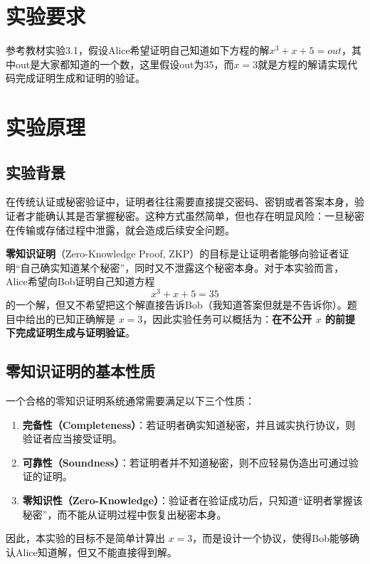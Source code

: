 \documentclass[a4paper]{article}
\begin{document}
\newpage


\section{实验要求}
参考教材实验3.1，假设Alice希望证明自己知道如下方程的解$ x^3 + x + 5 = out $，其中out是大家都知道的一个数，这里假设out为35，而$x=3$就是方程的解请实现代码完成证明生成和证明的验证。

\section{实验原理}
\subsection{实验背景}
在传统认证或秘密验证中，证明者往往需要直接提交密码、密钥或者答案本身，验证者才能确认其是否掌握秘密。这种方式虽然简单，但也存在明显风险：一旦秘密在传输或存储过程中泄露，就会造成后续安全问题。

\textbf{零知识证明}（Zero-Knowledge Proof, ZKP）的目标是让证明者能够向验证者证明“自己确实知道某个秘密”，同时又不泄露这个秘密本身\cite{GMR1989}。对于本实验而言，Alice希望向Bob证明自己知道方程
\[
x^3+x+5=35
\]
的一个解，但又不希望把这个解直接告诉Bob（我知道答案但就是不告诉你）。题目中给出的已知正确解是 $x=3$，因此实验任务可以概括为：\textbf{在不公开 $x$ 的前提下完成证明生成与证明验证}。

\subsection{零知识证明的基本性质}
一个合格的零知识证明系统通常需要满足以下三个性质：

\begin{enumerate}
    \item \textbf{完备性（Completeness）}：若证明者确实知道秘密，并且诚实执行协议，则验证者应当接受证明。
    \item \textbf{可靠性（Soundness）}：若证明者并不知道秘密，则不应轻易伪造出可通过验证的证明。
    \item \textbf{零知识性（Zero-Knowledge）}：验证者在验证成功后，只知道“证明者掌握该秘密”，而不能从证明过程中恢复出秘密本身。
\end{enumerate}

因此，本实验的目标不是简单计算出 $x=3$，而是设计一个协议，使得Bob能够确认Alice知道解，但又不能直接得到解。
\end{document}
